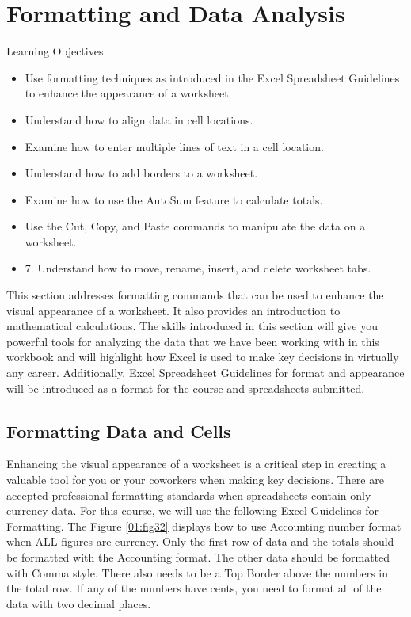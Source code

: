 \section{Formatting and Data Analysis}

\begin{center}
	\begin{objbox}{Learning Objectives}
		\begin{itemize}
			\setlength{\itemsep}{0pt}
			\setlength{\parskip}{0pt}
			\setlength{\parsep}{0pt}
			
			\item Use formatting techniques as introduced in the Excel Spreadsheet Guidelines to enhance the appearance of a worksheet.
			\item Understand how to align data in cell locations.
			\item Examine how to enter multiple lines of text in a cell location.
			\item Understand how to add borders to a worksheet.
			\item Examine how to use the AutoSum feature to calculate totals.
			\item Use the Cut, Copy, and Paste commands to manipulate the data on a worksheet.
			\item 7. Understand how to move, rename, insert, and delete worksheet tabs.
		\end{itemize}
	\end{objbox}
\end{center}

This section addresses formatting commands that can be used to enhance the visual appearance of a worksheet. It also provides an introduction to mathematical calculations. The skills introduced in this section will give you powerful tools for analyzing the data that we have been working with in this workbook and will highlight how Excel is used to make key decisions in virtually any career. Additionally, Excel Spreadsheet Guidelines for format and appearance will be introduced as a format for the course and spreadsheets submitted.

\subsection{Formatting Data and Cells}

Enhancing the visual appearance of a worksheet is a critical step in creating a valuable tool for you or your coworkers when making key decisions. There are accepted professional formatting standards when spreadsheets contain only currency data. For this course, we will use the following Excel Guidelines for Formatting. The Figure \ref{01:fig32} displays how to use Accounting number format when ALL figures are currency. Only the first row of data and the totals should be formatted with the Accounting format. The other data should be formatted with Comma style. There also needs to be a Top Border above the numbers in the total row. If any of the numbers have cents, you need to format all of the data with two decimal places.

